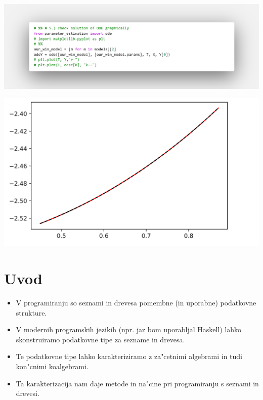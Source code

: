 \documentclass[t,usenames,dvipsnames]{beamer} %
\begin{document}
\begin{frame}
	\includegraphics[width=1.1\paperwidth]
	{code-shots/5graphic-check.png}
\end{frame}
\restoregeometry

\begin{frame}
\includegraphics[height=0.85\paperheight]
{code-shots/5_1plotScr.png}
\end{frame}


\section{Uvod}

\begin{frame}

	\begin{itemize}
		\item V programiranju so seznami in drevesa pomembne (in uporabne) podatkovne strukture.
		
		\item V modernih programskih jezikih (npr. jaz bom uporabljal Haskell) lahko skonstruiramo podatkovne tipe za sezname in drevesa.
		
		\item Te podatkovne tipe lahko karakteriziramo z za"cetnimi algebrami in tudi kon"cnimi koalgebrami.
		
		\item Ta karakterizacija nam daje metode in na"cine pri programiranju s seznami in drevesi.
	\end{itemize}
\end{frame}
\end{document}
